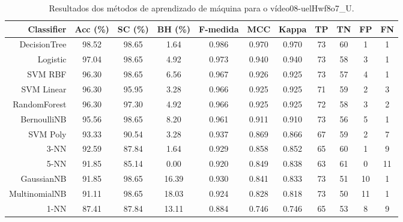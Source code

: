 \begin{table}[!htb]
\centering
\caption{Resultados dos métodos de aprendizado de máquina para o vídeo08-uelHwf8o7_U.}
\label{tab:08-uelHwf8o7_U}
\begin{tabular}{r|c|c|c|c|c|c|c|c|c|c}
\hline\hline
Classifier & Acc (\%) & SC (\%) & BH (\%) & F-medida & MCC & Kappa & TP & TN & FP & FN \\ \hline
DecisionTree & 98.52 & 98.65 & 1.64 & 0.986 & 0.970 & 0.970 & 73 & 60 & 1 & 1 \\ 
Logistic & 97.04 & 98.65 & 4.92 & 0.973 & 0.940 & 0.940 & 73 & 58 & 3 & 1 \\ 
SVM RBF & 96.30 & 98.65 & 6.56 & 0.967 & 0.926 & 0.925 & 73 & 57 & 4 & 1 \\ 
SVM Linear & 96.30 & 95.95 & 3.28 & 0.966 & 0.925 & 0.925 & 71 & 59 & 2 & 3 \\ 
RandomForest & 96.30 & 97.30 & 4.92 & 0.966 & 0.925 & 0.925 & 72 & 58 & 3 & 2 \\ 
BernoulliNB & 95.56 & 98.65 & 8.20 & 0.961 & 0.911 & 0.910 & 73 & 56 & 5 & 1 \\ 
SVM Poly & 93.33 & 90.54 & 3.28 & 0.937 & 0.869 & 0.866 & 67 & 59 & 2 & 7 \\ 
3-NN & 92.59 & 87.84 & 1.64 & 0.929 & 0.858 & 0.852 & 65 & 60 & 1 & 9 \\ 
5-NN & 91.85 & 85.14 & 0.00 & 0.920 & 0.849 & 0.838 & 63 & 61 & 0 & 11 \\ 
GaussianNB & 91.85 & 98.65 & 16.39 & 0.930 & 0.841 & 0.833 & 73 & 51 & 10 & 1 \\ 
MultinomialNB & 91.11 & 98.65 & 18.03 & 0.924 & 0.828 & 0.818 & 73 & 50 & 11 & 1 \\ 
1-NN & 87.41 & 87.84 & 13.11 & 0.884 & 0.746 & 0.746 & 65 & 53 & 8 & 9 \\ 
\hline\hline
\end{tabular}
\end{table}
